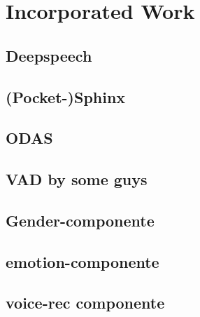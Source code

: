 
\section{Incorporated Work}

\subsection{Deepspeech}

\subsection{(Pocket-)Sphinx}

\subsection{ODAS}

\subsection{VAD by some guys}

\subsection{Gender-componente}

\subsection{emotion-componente}

\subsection{voice-rec componente}